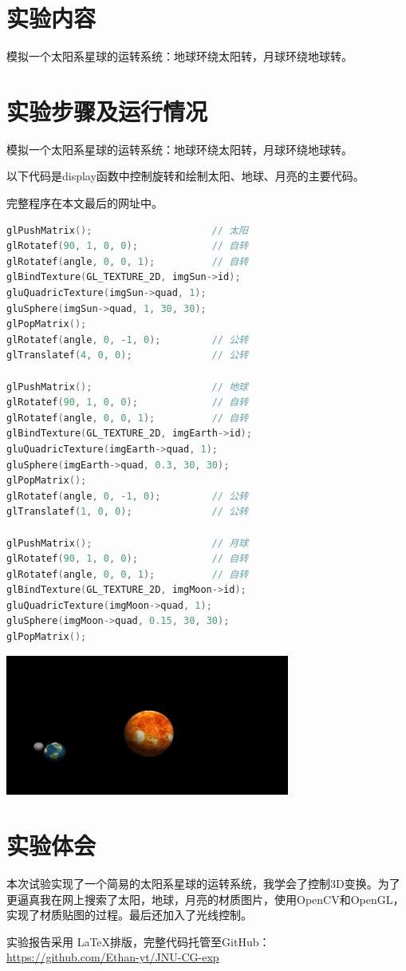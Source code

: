 \documentclass{JNUexp}
\begin{document}
 

\section{实验内容}
模拟一个太阳系星球的运转系统：地球环绕太阳转，月球环绕地球转。

\section{实验步骤及运行情况}
\begin{problem}
    模拟一个太阳系星球的运转系统：地球环绕太阳转，月球环绕地球转。
\end{problem}

\begin{answer}
以下代码是display函数中控制旋转和绘制太阳、地球、月亮的主要代码。

完整程序在本文最后的网址中。

    \begin{lstlisting}[language=C++]
glPushMatrix();                     // 太阳
glRotatef(90, 1, 0, 0);             // 自转
glRotatef(angle, 0, 0, 1);          // 自转
glBindTexture(GL_TEXTURE_2D, imgSun->id);
gluQuadricTexture(imgSun->quad, 1);
gluSphere(imgSun->quad, 1, 30, 30);
glPopMatrix();
glRotatef(angle, 0, -1, 0);         // 公转
glTranslatef(4, 0, 0);              // 公转

glPushMatrix();                     // 地球
glRotatef(90, 1, 0, 0);             // 自转
glRotatef(angle, 0, 0, 1);          // 自转
glBindTexture(GL_TEXTURE_2D, imgEarth->id);
gluQuadricTexture(imgEarth->quad, 1);
gluSphere(imgEarth->quad, 0.3, 30, 30);
glPopMatrix();
glRotatef(angle, 0, -1, 0);         // 公转
glTranslatef(1, 0, 0);              // 公转

glPushMatrix();                     // 月球
glRotatef(90, 1, 0, 0);             // 自转
glRotatef(angle, 0, 0, 1);          // 自转
glBindTexture(GL_TEXTURE_2D, imgMoon->id);
gluQuadricTexture(imgMoon->quad, 1);
gluSphere(imgMoon->quad, 0.15, 30, 30);
glPopMatrix();
    \end{lstlisting}
\end{answer}

\begin{image}
    \includegraphics[width=0.7\textwidth]{1}
\end{image}

\newpage
\section{实验体会}
本次试验实现了一个简易的太阳系星球的运转系统，我学会了控制3D变换。为了更逼真我在网上搜索了太阳，地球，月亮的材质图片，使用OpenCV和OpenGL，实现了材质贴图的过程。最后还加入了光线控制。


\vfill

实验报告采用 \LaTeX 排版，完整代码托管至GitHub：\\
\url{https://github.com/Ethan-yt/JNU-CG-exp}
\end{document}

